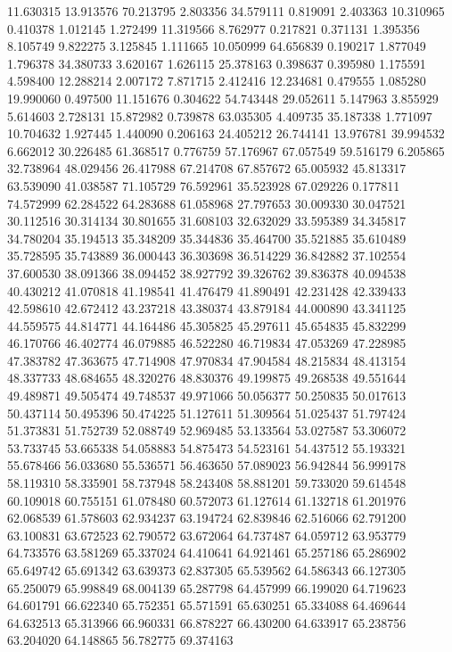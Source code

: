 11.630315
13.913576
70.213795
2.803356
34.579111
0.819091
2.403363
10.310965
0.410378
1.012145
1.272499
11.319566
8.762977
0.217821
0.371131
1.395356
8.105749
9.822275
3.125845
1.111665
10.050999
64.656839
0.190217
1.877049
1.796378
34.380733
3.620167
1.626115
25.378163
0.398637
0.395980
1.175591
4.598400
12.288214
2.007172
7.871715
2.412416
12.234681
0.479555
1.085280
19.990060
0.497500
11.151676
0.304622
54.743448
29.052611
5.147963
3.855929
5.614603
2.728131
15.872982
0.739878
63.035305
4.409735
35.187338
1.771097
10.704632
1.927445
1.440090
0.206163
24.405212
26.744141
13.976781
39.994532
6.662012
30.226485
61.368517
0.776759
57.176967
67.057549
59.516179
6.205865
32.738964
48.029456
26.417988
67.214708
67.857672
65.005932
45.813317
63.539090
41.038587
71.105729
76.592961
35.523928
67.029226
0.177811
74.572999
62.284522
64.283688
61.058968
27.797653
30.009330
30.047521
30.112516
30.314134
30.801655
31.608103
32.632029
33.595389
34.345817
34.780204
35.194513
35.348209
35.344836
35.464700
35.521885
35.610489
35.728595
35.743889
36.000443
36.303698
36.514229
36.842882
37.102554
37.600530
38.091366
38.094452
38.927792
39.326762
39.836378
40.094538
40.430212
41.070818
41.198541
41.476479
41.890491
42.231428
42.339433
42.598610
42.672412
43.237218
43.380374
43.879184
44.000890
43.341125
44.559575
44.814771
44.164486
45.305825
45.297611
45.654835
45.832299
46.170766
46.402774
46.079885
46.522280
46.719834
47.053269
47.228985
47.383782
47.363675
47.714908
47.970834
47.904584
48.215834
48.413154
48.337733
48.684655
48.320276
48.830376
49.199875
49.268538
49.551644
49.489871
49.505474
49.748537
49.971066
50.056377
50.250835
50.017613
50.437114
50.495396
50.474225
51.127611
51.309564
51.025437
51.797424
51.373831
51.752739
52.088749
52.969485
53.133564
53.027587
53.306072
53.733745
53.665338
54.058883
54.875473
54.523161
54.437512
55.193321
55.678466
56.033680
55.536571
56.463650
57.089023
56.942844
56.999178
58.119310
58.335901
58.737948
58.243408
58.881201
59.733020
59.614548
60.109018
60.755151
61.078480
60.572073
61.127614
61.132718
61.201976
62.068539
61.578603
62.934237
63.194724
62.839846
62.516066
62.791200
63.100831
63.672523
62.790572
63.672064
64.737487
64.059712
63.953779
64.733576
63.581269
65.337024
64.410641
64.921461
65.257186
65.286902
65.649742
65.691342
63.639373
62.837305
65.539562
64.586343
66.127305
65.250079
65.998849
68.004139
65.287798
64.457999
66.199020
64.719623
64.601791
66.622340
65.752351
65.571591
65.630251
65.334088
64.469644
64.632513
65.313966
66.960331
66.878227
66.430200
64.633917
65.238756
63.204020
64.148865
56.782775
69.374163

